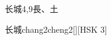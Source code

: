 \begin{entry}{长城}{4,9}{⾧、⼟}
  \begin{phonetics}{长城}{chang2cheng2}[][HSK 3]
  \end{phonetics}
\end{entry}
